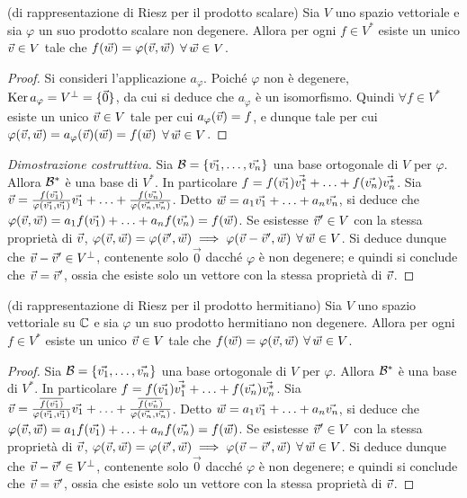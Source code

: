 \hr	

\begin{theorem} (di rappresentazione di Riesz per il prodotto scalare) 
	Sia $V$ uno spazio vettoriale e sia $\varphi$ un suo prodotto scalare
	non degenere. Allora per ogni $f \in V^*$ esiste un unico $\v \in V$ tale che
	$f(\w) = \varphi(\v, \w)$ $\forall \w \in V$.
\end{theorem}

\begin{proof}
	Si consideri l'applicazione $a_\varphi$. Poiché $\varphi$ non è degenere, $\Ker a_\varphi = V^\perp = \zerovecset$, da cui si deduce che $a_\varphi$ è un isomorfismo. Quindi $\forall f \in V^*$ esiste
	un unico $\v \in V$ tale per cui $a_\varphi(\v) = f$, e dunque tale per cui $\varphi(\v, \w) = a_\varphi(\v)(\w) = f(\w)$ $\forall \w \in V$.
\end{proof}

\begin{proof}[Dimostrazione costruttiva]
	Sia $\basis = \{ \vv 1, \ldots, \vv n \}$ una base ortogonale di $V$ per $\varphi$. Allora $\mathcal{B}^*$ è una base di $V^*$. In
	particolare $f = f(\vv 1) \vec{v_1^*} + \ldots + f(\vv n) \vec{v_n^*}$. Sia $\v = \frac{f(\vv 1)}{\varphi(\vv 1, \vv 1)} \vv 1 + \ldots + \frac{f(\vv n)}{\varphi(\vv n, \vv n)}$. Detto $\w = a_1 \vv 1 + \ldots + a_n \vv n$,
	si deduce che $\varphi(\v, \w) = a_1 f(\vv 1) + \ldots + a_n f(\vv n) = f(\w)$. Se esistesse $\v' \in V$ con
	la stessa proprietà di $\v$, $\varphi(\v, \w) = \varphi(\v', \w) \implies \varphi(\v - \v', \w)$ $\forall \w \in V$. Si deduce dunque che $\v - \v' \in V^\perp$, contenente solo $\vec 0$ dacché $\varphi$ è non degenere;
	e quindi si conclude che $\v = \v'$, ossia che esiste solo un vettore con la stessa proprietà di $\v$.
\end{proof}

\begin{theorem} (di rappresentazione di Riesz per il prodotto hermitiano)
	Sia $V$ uno spazio vettoriale su $\mathbb C$ e sia $\varphi$ un suo prodotto hermitiano non
	degenere. Allora per ogni $f \in V^*$ esiste un unico $\v \in V$ tale che
	$f(\w) = \varphi(\v, \w)$ $\forall \w \in V$.
\end{theorem}

\begin{proof}
	Sia $\basis = \{ \vv 1, \ldots, \vv n \}$ una base ortogonale di $V$ per $\varphi$. Allora $\mathcal{B}^*$ è una base di $V^*$. In
	particolare $f = f(\vv 1) \vec{v_1^*} + \ldots + f(\vv n) \vec{v_n^*}$. Sia $\v = \frac{\conj{f(\vv 1)}}{\varphi(\vv 1, \vv 1)} \vv 1 + \ldots + \frac{\conj{f(\vv n)}}{\varphi(\vv n, \vv n)}$. Detto $\w = a_1 \vv 1 + \ldots + a_n \vv n$,
	si deduce che $\varphi(\v, \w) = a_1 f(\vv 1) + \ldots + a_n f(\vv n) = f(\w)$. Se esistesse $\v' \in V$ con
	la stessa proprietà di $\v$, $\varphi(\v, \w) = \varphi(\v', \w) \implies \varphi(\v - \v', \w)$ $\forall \w \in V$. Si deduce dunque che $\v - \v' \in V^\perp$, contenente solo $\vec 0$ dacché $\varphi$ è non degenere;
	e quindi si conclude che $\v = \v'$, ossia che esiste solo un vettore con la stessa proprietà di $\v$.
\end{proof}

